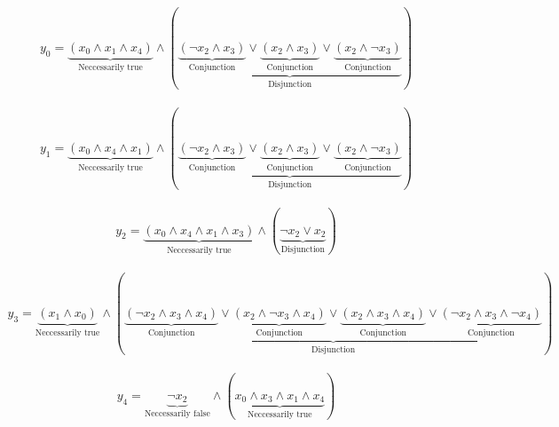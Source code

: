 \documentclass[margin=300pt,preview,fleqn,varwidth]{standalone}
\begin{document}
	
\begin{equation}\begin{aligned}
	y_0 = \underbrace{\left(x_0 \wedge x_1 \wedge x_4\right)}_{\text{Neccessarily true}} \wedge (\underbrace{\underbrace{\left( \lnot x_2 \wedge x_3\right)}_{\text{Conjunction}} \lor \underbrace{\left(x_2 \wedge x_3\right)}_{\text{Conjunction}} \lor \underbrace{\left(x_2 \wedge  \lnot x_3\right)}_{\text{Conjunction}}}_{\text{Disjunction}})
\end{aligned}\end{equation}

\begin{equation}\begin{aligned}
	y_1 = \underbrace{\left(x_0 \wedge x_4 \wedge x_1\right)}_{\text{Neccessarily true}} \wedge (\underbrace{\underbrace{\left( \lnot x_2 \wedge x_3\right)}_{\text{Conjunction}} \lor \underbrace{\left(x_2 \wedge x_3\right)}_{\text{Conjunction}} \lor \underbrace{\left(x_2 \wedge  \lnot x_3\right)}_{\text{Conjunction}}}_{\text{Disjunction}})
\end{aligned}\end{equation}

\begin{equation}\begin{aligned}
	y_2 = \underbrace{\left(x_0 \wedge x_4 \wedge x_1 \wedge x_3\right)}_{\text{Neccessarily true}} \wedge (\underbrace{ \lnot x_2 \lor x_2}_{\text{Disjunction}})
\end{aligned}\end{equation}

\begin{equation}\begin{aligned}
	y_3 = \underbrace{\left(x_1 \wedge x_0\right)}_{\text{Neccessarily true}} \wedge (\underbrace{\underbrace{\left( \lnot x_2 \wedge x_3 \wedge x_4\right)}_{\text{Conjunction}} \lor \underbrace{\left(x_2 \wedge  \lnot x_3 \wedge x_4\right)}_{\text{Conjunction}} \lor \underbrace{\left(x_2 \wedge x_3 \wedge x_4\right)}_{\text{Conjunction}} \lor \underbrace{\left( \lnot x_2 \wedge x_3 \wedge  \lnot x_4\right)}_{\text{Conjunction}}}_{\text{Disjunction}})
\end{aligned}\end{equation}

\begin{equation}\begin{aligned}
	y_4 = \underbrace{ \lnot x_2}_{\text{Neccessarily false}} \wedge (\underbrace{x_0 \wedge x_3 \wedge x_1 \wedge x_4}_{\text{Neccessarily true}})
\end{aligned}\end{equation}
\end{document}
